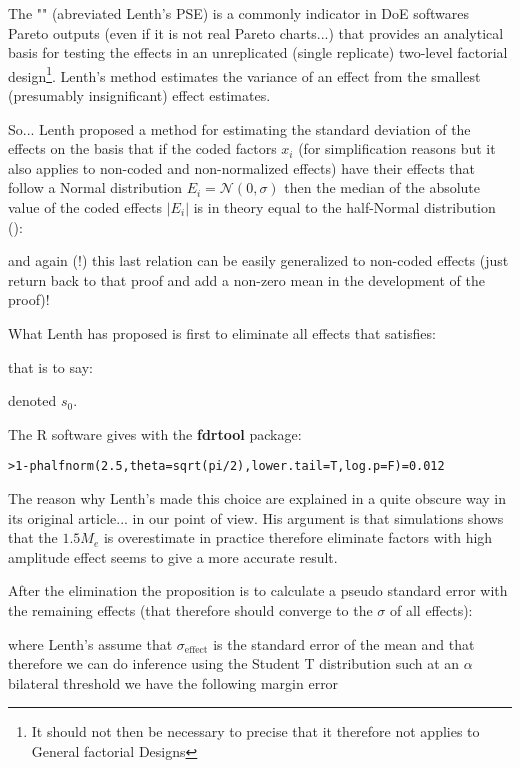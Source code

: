 	The "" (abreviated Lenth's PSE) is a commonly indicator in DoE softwares Pareto outputs (even if it is not real Pareto charts...) that provides an analytical basis for testing the effects in an unreplicated (single replicate) two-level factorial design\footnote{It should not then be necessary to precise that it therefore not applies to General factorial Designs}. Lenth's method estimates the variance of an effect from the smallest (presumably insignificant) effect estimates.
	
	So... Lenth proposed a method for estimating the standard deviation of the effects on the basis that if the coded factors $x_i$ (for simplification reasons but it also applies to non-coded and non-normalized effects) have their effects that follow a Normal distribution $E_i=\mathcal{N}(0,\sigma)$ then the median of the absolute value of the coded effects $|E_i|$ is in theory equal to the half-Normal distribution ():
	
	and again (!) this last relation can be easily generalized to non-coded effects (just return back to that proof and add a non-zero mean in the development of the proof)!
	
	What Lenth has proposed is first to eliminate all effects that satisfies:
	
	that is to say:
	
	denoted $s_0$.
	
	The R software gives with the \textbf{fdrtool} package:
	\begin{center}
	\texttt{>1-phalfnorm(2.5,theta=sqrt(pi/2),lower.tail=T,log.p=F)=0.012}
	\end{center}
	
	The reason why Lenth's made this choice are explained in a quite obscure way in its original article... in our point of view. His argument is that simulations shows that the $1.5M_e$ is overestimate in practice therefore eliminate factors with high amplitude effect seems to give a more accurate result.
	
	After the elimination the proposition is to calculate a pseudo standard error with the remaining effects (that therefore should converge to the $\sigma$ of all effects):
	
	where Lenth's assume that $\sigma_{\text{effect}}$ is the standard error of the mean and that therefore we can do inference using the Student T distribution such at an $\alpha$ bilateral threshold we have the following margin error
	
